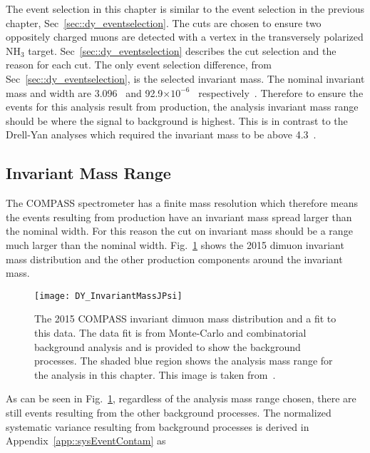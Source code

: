 The event selection in this chapter is similar to the event selection in the
previous chapter, Sec~\ref{sec::dy_eventselection}.  The cuts are chosen to
ensure two oppositely charged muons are detected with a vertex in the
transversely polarized NH$_3$ target.  Sec~\ref{sec::dy_eventselection}
describes the cut selection and the reason for each cut.  The only event
selection difference, from Sec~\ref{sec::dy_eventselection}, is the selected
invariant mass.  The nominal {\jp} invariant mass and width are 3.096~{\gvcw}
and 92.9$\times10^{-6}$~{\gvcw} respectively~\cite{Tanabashi:2018oca}.
Therefore to ensure the events for this analysis result from {\jp} production,
the analysis invariant mass range should be where the {\jp} signal to background
is highest.  This is in contrast to the Drell-Yan analyses which required the
invariant mass to be above 4.3~{\gvcw}.

\subsection{{\jp} Invariant Mass Range}\label{sec::jpMassRange}
The COMPASS spectrometer has a finite mass resolution which therefore means the
events resulting from {\jp} production have an invariant mass spread larger than
the nominal {\jp} width.  For this reason the cut on invariant mass should be a
range much larger than the nominal {\jp} width.
Fig.~\ref{fig::DY_InvariantMassJPsi} shows the 2015 dimuon invariant mass
distribution and the other production components around the {\jp} invariant
mass.

\begin{figure}[h!t]
  \centering \texttt{[image: DY\_InvariantMassJPsi]}
  \caption{The 2015 COMPASS invariant dimuon mass distribution and a fit to this
    data.  The data fit is from Monte-Carlo and combinatorial background
    analysis and is provided to show the background processes.  The shaded blue
    region shows the analysis mass range for the analysis in this chapter.  This
    image is taken from~\cite{compassDYpaper}.}
  \label{fig::DY_InvariantMassJPsi}
\end{figure}

As can be seen in Fig.~\ref{fig::DY_InvariantMassJPsi}, regardless of the
analysis mass range chosen, there are still events resulting from the other
background processes.  The normalized systematic variance resulting from
background processes is derived in Appendix~\ref{app::sysEventContam} as

